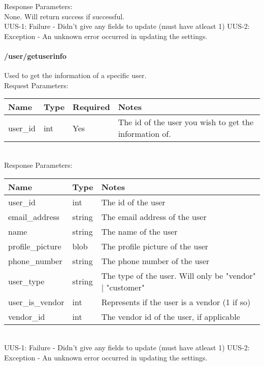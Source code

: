 \documentclass{article}[11pt]
\begin{document}
\noindent
Response Parameters: \\
None. Will return success if successful. \\

\ErrorsSession
UUS-1: Failure - Didn't give any fields to update (must have atleast 1)
UUS-2: Exception - An unknown error occurred in updating the settings.


\paragraph{/user/getuserinfo}\textbf{}

Used to get the information of a specific user. \\

\noindent
Request Parameters:

\noindent
\begin{tabular}{|l|l|l|l|}
\hline
\textbf{Name} & \textbf{Type} & \textbf{Required} & \textbf{Notes} \\
\hline
user\_id & int & Yes & The id of the user you wish to get the information of. \\
\hline
\end{tabular} \\

\noindent
Response Parameters:

\noindent
\begin{tabular}{|l|l|l|}
\hline
\textbf{Name} & \textbf{Type} & \textbf{Notes} \\
\hline
user\_id & int & The id of the user \\
email\_address & string & The email address of the user \\
name & string & The name of the user \\
profile\_picture & blob & The profile picture of the user \\
phone\_number & string & The phone number of the user \\
user\_type & string & The type of the user. Will only be "vendor" $\vert$ "customer" \\
user\_is\_vendor & int & Represents if the user is a vendor (1 if so) \\
vendor\_id & int & The vendor id of the user, if applicable \\
\hline
\end{tabular} \\

\ErrorsSession
UUS-1: Failure - Didn't give any fields to update (must have atleast 1)
UUS-2: Exception - An unknown error occurred in updating the settings.
\end{document}
